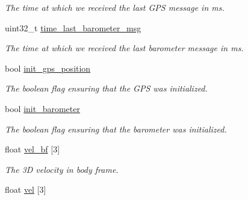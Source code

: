\begin{DoxyCompactItemize}
\begin{DoxyCompactList}\small\item\em The time at which we received the last G\+P\+S message in ms. \end{DoxyCompactList}\item 
\hypertarget{structposition__estimator__t_a931d4985552cf55692341cb703faacdc}{uint32\+\_\+t \hyperlink{structposition__estimator__t_a931d4985552cf55692341cb703faacdc}{time\+\_\+last\+\_\+barometer\+\_\+msg}}\label{structposition__estimator__t_a931d4985552cf55692341cb703faacdc}

\begin{DoxyCompactList}\small\item\em The time at which we received the last barometer message in ms. \end{DoxyCompactList}\item 
\hypertarget{structposition__estimator__t_aad5c5580269e1f7d924815c486b7f35a}{bool \hyperlink{structposition__estimator__t_aad5c5580269e1f7d924815c486b7f35a}{init\+\_\+gps\+\_\+position}}\label{structposition__estimator__t_aad5c5580269e1f7d924815c486b7f35a}

\begin{DoxyCompactList}\small\item\em The boolean flag ensuring that the G\+P\+S was initialized. \end{DoxyCompactList}\item 
\hypertarget{structposition__estimator__t_a8f53823e1b507ecba9c406fa1f079338}{bool \hyperlink{structposition__estimator__t_a8f53823e1b507ecba9c406fa1f079338}{init\+\_\+barometer}}\label{structposition__estimator__t_a8f53823e1b507ecba9c406fa1f079338}

\begin{DoxyCompactList}\small\item\em The boolean flag ensuring that the barometer was initialized. \end{DoxyCompactList}\item 
\hypertarget{structposition__estimator__t_a28ede0256abb7b63c2d9ec0bec1e02c6}{float \hyperlink{structposition__estimator__t_a28ede0256abb7b63c2d9ec0bec1e02c6}{vel\+\_\+bf} \mbox{[}3\mbox{]}}\label{structposition__estimator__t_a28ede0256abb7b63c2d9ec0bec1e02c6}

\begin{DoxyCompactList}\small\item\em The 3\+D velocity in body frame. \end{DoxyCompactList}\item 
\hypertarget{structposition__estimator__t_a6ef7bf29e5d466e719d15b5eb72d4504}{float \hyperlink{structposition__estimator__t_a6ef7bf29e5d466e719d15b5eb72d4504}{vel} \mbox{[}3\mbox{]}}\label{structposition__estimator__t_a6ef7bf29e5d466e719d15b5eb72d4504}


\end{DoxyCompactItemize}
